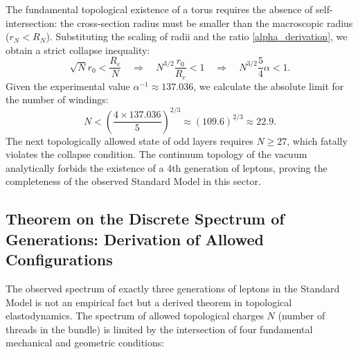\documentclass[11pt,a4paper]{article}
\begin{document}
	The fundamental topological existence of a torus requires the absence of self-intersection: the cross-section radius must be smaller than the macroscopic radius ($r_N < R_N$). Substituting the scaling of radii and the ratio \eqref{alpha_derivation}, we obtain a strict collapse inequality:
	\begin{equation}
		\sqrt{N} r_0 < \frac{R_e}{N} \quad \Longrightarrow \quad N^{3/2} \frac{r_0}{R_e} < 1 \quad \Longrightarrow \quad N^{3/2} \frac{5}{4}\alpha < 1.
	\end{equation}
	Given the experimental value $\alpha^{-1} \approx 137.036$, we calculate the absolute limit for the number of windings:
	\begin{equation}
		N < \left( \frac{4 \times 137.036}{5} \right)^{2/3} \approx (109.6)^{2/3} \approx 22.9.
	\end{equation}
	The next topologically allowed state of odd layers requires $N \ge 27$, which fatally violates the collapse condition. The continuum topology of the vacuum analytically forbids the existence of a 4th generation of leptons, proving the completeness of the observed Standard Model in this sector.
	
\subsection{Theorem on the Discrete Spectrum of Generations: Derivation of Allowed Configurations}
	The observed spectrum of exactly three generations of leptons in the Standard Model is not an empirical fact but a derived theorem in topological elastodynamics. The spectrum of allowed topological charges $N$ (number of threads in the bundle) is limited by the intersection of four fundamental mechanical and geometric conditions:
	
\end{document}

